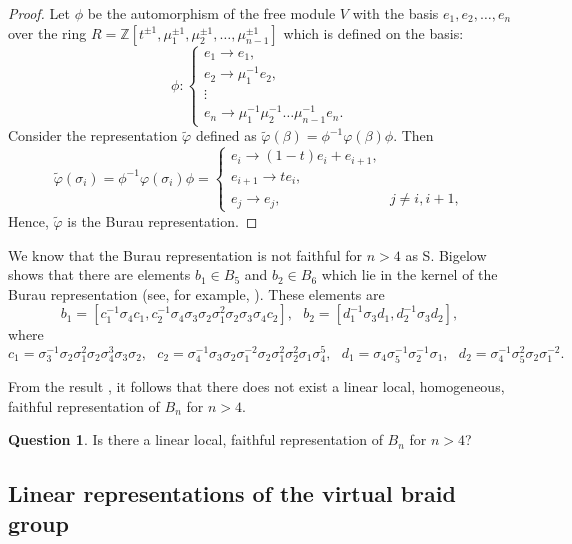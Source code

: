 \documentclass[11 pt, reqno]{amsart}
\theoremstyle{definition}
\newtheorem{question}[theorem]{Question}
\numberwithin{equation}{subsection}
\begin{document}
\begin{proof}
Let $\phi$ be the automorphism of the free module $V$ with the basis $e_1, e_2, \ldots, e_n$ over the ring $R = \mathbb{Z}[t^{\pm 1}, \mu_1^{\pm 1}, \mu_2^{\pm 1}, \ldots, \mu_{n-1}^{\pm 1}]$ which is defined on the basis:
$$
\phi :  \left\{
\begin{array}{l}
e_1 \to    e_{1},    \\
e_2 \to \mu_1^{-1} e_2,  \\
\vdots  \\
e_n \to \mu_1^{-1} \mu_2^{-1}  \ldots \mu_{n-1}^{-1} e_n.
\end{array}
\right.
$$
Consider the representation $\tilde{\varphi}$ defined as $\tilde{\varphi}(\beta) = \phi^{-1} \varphi(\beta) \phi$. Then
$$
\tilde{\varphi} (\sigma_i) = \phi^{-1} \varphi(\sigma_i) \phi  =
 \left\{
\begin{array}{ll}
e_i \to  (1-t) e_i +  e_{i+1}, &   \\
e_{i+1} \to t   e_i, & \\
e_j \to e_j, & j \not= i, i+1,
\end{array}
\right.
$$
Hence, $\tilde{\varphi}$ is the Burau representation.


\end{proof}

We know that the  Burau representation is not faithful for $n>4$ as S. Bigelow \cite{Bigelow-1} shows that there are elements $b_1 \in B_5$ and $b_2 \in B_6$ which lie in the kernel of the Burau representation (see, for example, \cite{BF}). These elements are
$$
b_1 = [c_1^{-1} \sigma_4 c_1, c_2^{-1} \sigma_4 \sigma_3 \sigma_2 \sigma_1^2 \sigma_2 \sigma_3 \sigma_4 c_2],~~~
b_2 = [d_1^{-1} \sigma_3 d_1, d_2^{-1}  \sigma_3 d_2],
$$
where
$$
c_1 = \sigma_3^{-1}   \sigma_2  \sigma_1^2  \sigma_2  \sigma_4^3  \sigma_3  \sigma_2, ~~~c_2 = \sigma_4^{-1} \sigma_3  \sigma_2  \sigma_1^{-2}  \sigma_2  \sigma_1^2  \sigma_2^2  \sigma_1  \sigma_4^5, ~~~
d_1 =  \sigma_4  \sigma_5^{-1}  \sigma_2^{-1}  \sigma_1,~~~d_2 =  \sigma_4^{-1}  \sigma_5^2  \sigma_2  \sigma_1^{-2}.
$$

From the result \cite[Theorem 5.3]{BF-1}, it follows that there does not exist a linear local,  homogeneous, faithful representation of $B_n$ for $n > 4$.

\begin{question}
Is there a linear local,   faithful representation of $B_n$ for $n > 4$?
\end{question}

\subsection{Linear representations of the virtual braid group}\label{SS: Linear representations of the virtual braid group}
\end{document}
